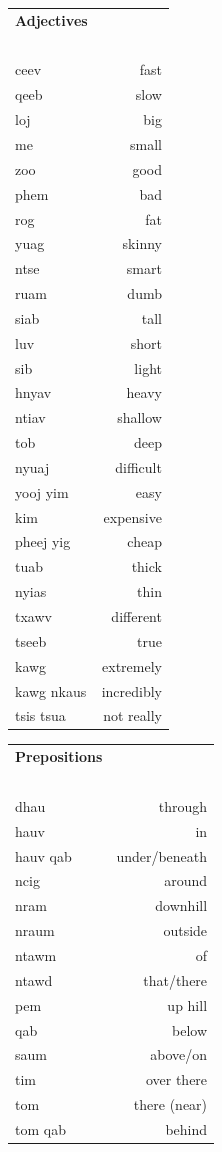 \documentclass{article}
\begin{document}
\clearpage

\begin{multicols}{2}
[
\section*{}
]

\begin{tabular}{l r}
\textbf{Adjectives} \\
~\\
ceev &fast\\
qeeb &slow\\
loj &big\\
me &small\\
zoo &good\\
phem &bad\\
rog &fat\\
yuag &skinny\\
ntse &smart\\
ruam &dumb\\
siab &tall\\
luv &short\\
sib &light\\
hnyav &heavy\\
ntiav &shallow\\
tob &deep\\
nyuaj &difficult\\
yooj yim &easy\\
kim &expensive\\
pheej yig &cheap\\
tuab &thick\\
nyias &thin\\
txawv &different\\
tseeb &true\\
kawg &extremely\\
kawg nkaus &incredibly\\
tsis tsua &not really\\
\end{tabular}

\begin{tabular}{l r}
\textbf{Prepositions} \\
~\\
dhau &through\\
hauv &in\\
hauv qab &under/beneath\\
ncig &around\\
nram &downhill\\
nraum &outside\\
ntawm &of\\
ntawd &that/there\\
pem &up hill\\
qab &below\\
saum &above/on\\
tim &over there\\
tom &there (near)\\
tom qab &behind\\
\end{tabular}


\end{multicols}
\end{document}
